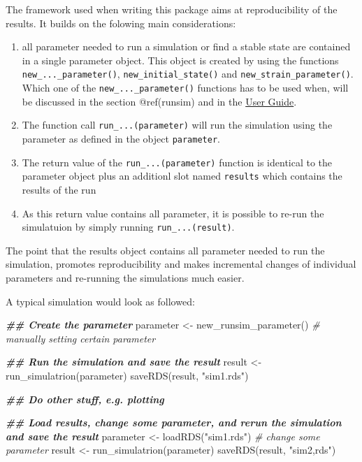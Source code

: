 \documentclass[]{elsarticle} %
\newenvironment{Shaded}{\begin{snugshade}}{\end{snugshade}}
\newcommand{\CommentTok}[1]{\textcolor[rgb]{0.56,0.35,0.01}{\textit{#1}}}
\newcommand{\DocumentationTok}[1]{\textcolor[rgb]{0.56,0.35,0.01}{\textbf{\textit{#1}}}}
\newcommand{\FunctionTok}[1]{\textcolor[rgb]{0.00,0.00,0.00}{#1}}
\newcommand{\NormalTok}[1]{#1}
\newcommand{\OtherTok}[1]{\textcolor[rgb]{0.56,0.35,0.01}{#1}}
\newcommand{\StringTok}[1]{\textcolor[rgb]{0.31,0.60,0.02}{#1}}
\providecommand{\tightlist}{%
  \setlength{\itemsep}{0pt}\setlength{\parskip}{0pt}}
\begin{document}
The framework used when writing this package aims at reproducibility of
the results. It builds on the folowing main considerations:

\begin{enumerate}
\def\labelenumi{\arabic{enumi}.}
\tightlist
\item
  all parameter needed to run a simulation or find a stable state are
  contained in a single parameter object. This object is created by
  using the functions \texttt{new\_...\_parameter()},
  \texttt{new\_initial\_state()} and \texttt{new\_strain\_parameter()}.
  Which one of the \texttt{new\_...\_parameter()} functions has to be
  used when, will be discussed in the section @ref(runsim) and in the
  \href{LINK_NEEDED}{User Guide}.
\item
  The function call \texttt{run\_...(parameter)} will run the simulation
  using the parameter as defined in the object \texttt{parameter}.
\item
  The return value of the \texttt{run\_...(parameter)} function is
  identical to the parameter object plus an additionl slot named
  \texttt{results} which contains the results of the run
\item
  As this return value contains all parameter, it is possible to re-run
  the simulatuion by simply running \texttt{run\_...(result)}.
\end{enumerate}

The point that the results object contains all parameter needed to run
the simulation, promotes reproducibility and makes incremental changes
of individual parameters and re-running the simulations much easier.

A typical simulation would look as followed:

\begin{Shaded}
\begin{Highlighting}[]
\DocumentationTok{\#\# Create the parameter}
\NormalTok{parameter }\OtherTok{\textless{}{-}} \FunctionTok{new\_runsim\_parameter}\NormalTok{()}
\CommentTok{\# manually setting certain parameter}

\DocumentationTok{\#\# Run the simulation and save the result}
\NormalTok{result }\OtherTok{\textless{}{-}} \FunctionTok{run\_simulatrion}\NormalTok{(parameter)}
\FunctionTok{saveRDS}\NormalTok{(result, }\StringTok{"sim1.rds"}\NormalTok{)}

\DocumentationTok{\#\# Do other stuff, e.g. plotting}

\DocumentationTok{\#\# Load results, change some parameter, and rerun the simulation and save the result}
\NormalTok{parameter }\OtherTok{\textless{}{-}} \FunctionTok{loadRDS}\NormalTok{(}\StringTok{"sim1.rds"}\NormalTok{)}
\CommentTok{\# change some parameter}
\NormalTok{result }\OtherTok{\textless{}{-}} \FunctionTok{run\_simulatrion}\NormalTok{(parameter)}
\FunctionTok{saveRDS}\NormalTok{(result, }\StringTok{"sim2,rds"}\NormalTok{)}
\end{Highlighting}
\end{Shaded}
\end{document}
